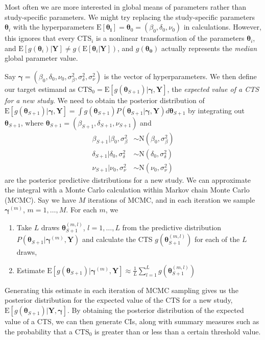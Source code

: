 \documentclass[AMA,STIX1COL]{WileyNJD-v2}
\newcommand{\E}{\mbox{E}}
\newcommand{\boldtheta}{\boldsymbol{\theta}}
\begin{document}
Most often we are more interested in global means of parameters rather than study-specific parameters. We might try replacing the study-specific parameters $\boldtheta_i$ with the hyperparameters $\E[\boldsymbol{\theta_i}] = \boldtheta_0 = (\beta_0, \delta_0, \nu_0)$ in calculations. However, this ignores that every CTS$_i$ is a nonlinear transformation of the parameters $\boldtheta_i$, and $\E[g(\boldtheta_i) \vert \boldsymbol{Y}] \ne g(\E[\boldtheta_i \vert \boldsymbol{Y}])$, and $g(\boldsymbol{\theta_0})$ actually represents the \textit{median} global parameter value. 

Say $\boldsymbol{\gamma} = (\beta_0, \delta_0, \nu_0, \sigma^2_{\beta}, \sigma^2_{\delta}, \sigma^2_{\nu})$ is the vector of hyperparameters. We then define our target estimand as $\mbox{CTS}_0 = \E[g(\boldtheta_{S+ 1})\vert \boldsymbol{\gamma}, \boldsymbol{Y}]$, the \textit{expected value of a CTS for a new study}. We need to obtain the posterior distribution of $\E[g(\boldtheta_{S + 1})\vert \boldsymbol{\gamma}, \boldsymbol{Y}] = \boldsymbol{\int}g(\boldtheta_{S + 1})  P(\boldtheta_{S + 1} \vert \boldsymbol{\gamma}, \boldsymbol{Y}) d\boldtheta_{S + 1}$ by integrating out $\boldtheta_{S + 1}$, where $\boldtheta_{S + 1} = (\beta_{S + 1}, \delta_{S + 1}, \nu_{S + 1})$ and 
\begin{align}
\beta_{S + 1} \vert \beta_0, \sigma^2_\beta & \sim \mbox{N}(\beta_0, \sigma^2_\beta) \nonumber \\ 
\delta_{S + 1} \vert \delta_0, \sigma^2_\delta & \sim \mbox{N}(\delta_0, \sigma^2_\delta) \nonumber \\
\nu_{S + 1} \vert \nu_0, \sigma^2_\nu & \sim \mbox{N}(\nu_0, \sigma^2_\nu) \nonumber
\end{align}
are the posterior predictive distributions for a new study. We can approximate the integral with a Monte Carlo calculation within Markov chain Monte Carlo (MCMC). Say we have $M$ iterations of MCMC, and in each iteration we sample $\boldsymbol{\gamma}^{(m)}$, $m = 1, \dots, M$. For each $m$, we
\begin{enumerate}
\item Take $L$ draws $\boldtheta_{S + 1}^{(m, l)}$, $l = 1, \dots, L$ from the predictive distribution $P(\boldtheta_{S + 1}\vert \boldsymbol{\gamma}^{(m)}, \boldsymbol{Y})$ and calculate the CTS $g(\boldtheta_{S + 1}^{(m, l)})$ for each of the $L$ draws, 
\item Estimate $\E[g(\boldtheta_{S + 1})\vert \boldsymbol{\gamma}^{(m)}, \boldsymbol{Y}] \approx \frac{1}{L} \sum_{l=1}^L g(\boldtheta_{S + 1}^{(m, l)})$
\end{enumerate}
Generating this estimate in each iteration of MCMC sampling gives us the posterior distribution for the expected value of the CTS for a new study, $\E[g(\boldtheta_{S + 1}) \vert \boldsymbol{Y}, \boldsymbol{\gamma}]$. By obtaining the posterior distribution of the expected value of a CTS, we can then generate CIs, along with summary measures such as the probability that a $\mbox{CTS}_0$ is greater than or less than a certain threshold value. 
\end{document}
